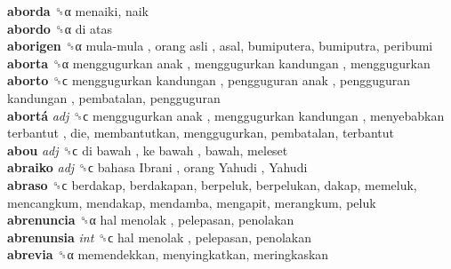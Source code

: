 \textbf{aborda} ␝α  menaiki, naik  \\
\textbf{abordo} ␝α   di atas   \\
\textbf{aborigen} ␝α   mula-mula ,  orang asli , asal, bumiputera, bumiputra, peribumi  \\
\textbf{aborta} ␝α   menggugurkan anak ,  menggugurkan kandungan , menggugurkan  \\
\textbf{aborto} ␝ϲ   menggugurkan kandungan ,  pengguguran anak ,  pengguguran kandungan , pembatalan, pengguguran  \\
\textbf{abortá} \emph{adj}  ␝ϲ   menggugurkan anak ,  menggugurkan kandungan ,  menyebabkan terbantut , die, membantutkan, menggugurkan, pembatalan, terbantut  \\
\textbf{abou} \emph{adj}  ␝ϲ   di bawah ,  ke bawah , bawah, meleset  \\
\textbf{abraiko} \emph{adj}  ␝ϲ   bahasa Ibrani ,  orang Yahudi ,  Yahudi   \\
\textbf{abraso} ␝ϲ  berdakap, berdakapan, berpeluk, berpelukan, dakap, memeluk, mencangkum, mendakap, mendamba, mengapit, merangkum, peluk  \\
\textbf{abrenuncia} ␝α   hal menolak , pelepasan, penolakan  \\
\textbf{abrenunsia} \emph{int}  ␝ϲ   hal menolak , pelepasan, penolakan  \\
\textbf{abrevia} ␝α  memendekkan, menyingkatkan, meringkaskan  \\
